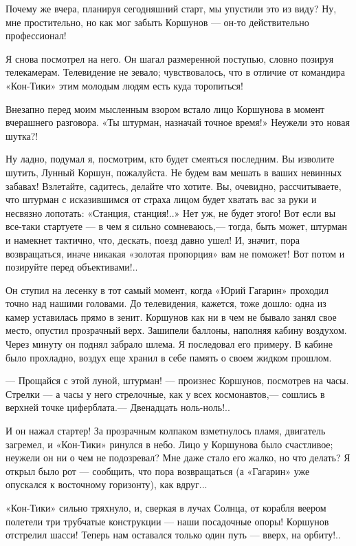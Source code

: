 \documentclass[11pt,a4paper,oneside]{article}
\begin{document}
Почему же вчера, планируя сегодняшний старт, мы упустили это из виду? Ну, мне простительно, но как мог забыть Коршунов — он-то действительно профессионал!

Я снова посмотрел на него. Он шагал размеренной поступью, словно позируя телекамерам. Телевидение не зевало; чувствовалось, что в отличие от командира «Кон-Тики» этим молодым людям есть куда торопиться!

Внезапно перед моим мысленным взором встало лицо Коршунова в момент вчерашнего разговора. «Ты штурман, назначай точное время!» Неужели это новая шутка?!

Ну ладно, подумал я, посмотрим, кто будет смеяться последним. Вы изволите шутить, Лунный Коршун, пожалуйста. Не будем вам мешать в ваших невинных забавах! Взлетайте, садитесь, делайте что хотите. Вы, очевидно, рассчитываете, что штурман с исказившимся от страха лицом будет хватать вас за руки и несвязно лопотать: «Станция, станция!..» Нет уж, не будет этого! Вот если вы все-таки стартуете — в чем я сильно сомневаюсь,— тогда, быть может, штурман и намекнет тактично, что, дескать, поезд давно ушел! И, значит, пора возвращаться, иначе никакая «золотая пропорция» вам не поможет! Вот потом и позируйте перед объективами!..

Он ступил на лесенку в тот самый момент, когда «Юрий Гагарин» проходил точно над нашими головами. До телевидения, кажется, тоже дошло: одна из камер уставилась прямо в зенит. Коршунов как ни в чем не бывало занял свое место, опустил прозрачный верх. Зашипели баллоны, наполняя кабину воздухом. Через минуту он поднял забрало шлема. Я последовал его примеру. В кабине было прохладно, воздух еще хранил в себе память о своем жидком прошлом.

— Прощайся с этой луной, штурман! — произнес Коршунов, посмотрев на часы. Стрелки — а часы у него стрелочные, как у всех космонавтов,— сошлись в верхней точке циферблата.— Двенадцать ноль-ноль!..

И он нажал стартер! За прозрачным колпаком взметнулось пламя, двигатель загремел, и «Кон-Тики» ринулся в небо. Лицо у Коршунова было счастливое; неужели он ни о чем не подозревал? Мне даже стало его жалко, но что делать? Я открыл было рот — сообщить, что пора возвращаться (а «Гагарин» уже опускался к восточному горизонту), как вдруг...

«Кон-Тики» сильно тряхнуло, и, сверкая в лучах Солнца, от корабля веером полетели три трубчатые конструкции — наши посадочные опоры! Коршунов отстрелил шасси! Теперь нам оставался только один путь — вверх, на орбиту!..
\end{document}
